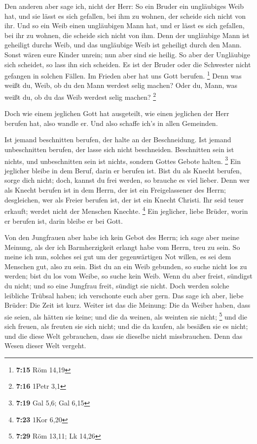  Den anderen aber sage ich, nicht der Herr: So ein Bruder
ein ungläubiges Weib hat, und sie lässt es sich gefallen, bei ihm zu
wohnen, der scheide sich nicht von ihr.  Und so ein Weib
einen ungläubigen Mann hat, und er lässt es sich gefallen, bei ihr zu
wohnen, die scheide sich nicht von ihm.  Denn der
ungläubige Mann ist geheiligt durchs Weib, und das ungläubige Weib ist
geheiligt durch den Mann. Sonst wären eure Kinder unrein; nun aber sind
sie heilig.  So aber der Ungläubige sich scheidet, so lass
ihn sich scheiden. Es ist der Bruder oder die Schwester nicht gefangen
in solchen Fällen. Im Frieden aber hat uns Gott berufen. \footnote{\textbf{7:15}
  Röm 14,19}  Denn was weißt du, Weib, ob du den Mann
werdest selig machen? Oder du, Mann, was weißt du, ob du das Weib
werdest selig machen? \footnote{\textbf{7:16} 1Petr 3,1}

 Doch wie einem jeglichen Gott hat ausgeteilt, wie einen
jeglichen der Herr berufen hat, also wandle er. Und also schaffe ich's
in allen Gemeinden.

 Ist jemand beschnitten berufen, der halte an der
Beschneidung. Ist jemand unbeschnitten berufen, der lasse sich nicht
beschneiden.  Beschnitten sein ist nichts, und
unbeschnitten sein ist nichts, sondern Gottes Gebote halten. \footnote{\textbf{7:19}
  Gal 5,6; Gal 6,15}  Ein jeglicher bleibe in dem Beruf,
darin er berufen ist.  Bist du als Knecht berufen, sorge
dich nicht; doch, kannst du frei werden, so brauche es viel lieber.
 Denn wer als Knecht berufen ist in dem Herrn, der ist ein
Freigelassener des Herrn; desgleichen, wer als Freier berufen ist, der
ist ein Knecht Christi.  Ihr seid teuer erkauft; werdet
nicht der Menschen Knechte. \footnote{\textbf{7:23} 1Kor 6,20}
 Ein jeglicher, liebe Brüder, worin er berufen ist, darin
bleibe er bei Gott.

 Von den Jungfrauen aber habe ich kein Gebot des Herrn; ich
sage aber meine Meinung, als der ich Barmherzigkeit erlangt habe vom
Herrn, treu zu sein.  So meine ich nun, solches sei gut um
der gegenwärtigen Not willen, es sei dem Menschen gut, also zu sein.
 Bist du an ein Weib gebunden, so suche nicht los zu
werden; bist du los vom Weibe, so suche kein Weib.  Wenn du
aber freist, sündigst du nicht; und so eine Jungfrau freit, sündigt sie
nicht. Doch werden solche leibliche Trübsal haben; ich verschonte euch
aber gern.  Das sage ich aber, liebe Brüder: Die Zeit ist
kurz. Weiter ist das die Meinung: Die da Weiber haben, dass sie seien,
als hätten sie keine; und die da weinen, als weinten sie nicht;
\footnote{\textbf{7:29} Röm 13,11; Lk 14,26}  und die sich
freuen, als freuten sie sich nicht; und die da kaufen, als besäßen sie
es nicht;  und die diese Welt gebrauchen, dass sie dieselbe
nicht missbrauchen. Denn das Wesen dieser Welt vergeht.

